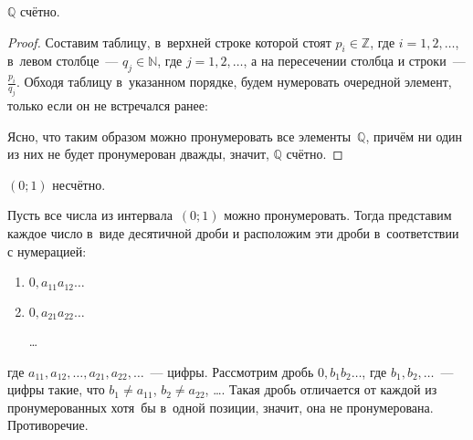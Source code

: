 \begin{statement}
$\mathbb Q$ счётно.
\end{statement}
\begin{proof}
Составим таблицу, в~верхней строке которой стоят $p_i \in \mathbb Z$, где $i = 1, 2, \ldots$, в~левом столбце~--- $q_j \in \mathbb N$, где $j = 1, 2, \ldots$, а на пересечении столбца и строки~--- $\frac{p_i}{q_j}$.
Обходя таблицу в~указанном порядке, будем нумеровать очередной элемент, только если он не встречался ранее:


Ясно, что таким образом можно пронумеровать все элементы~$\mathbb Q$, причём ни один из них не будет пронумерован дважды, значит, $\mathbb Q$ счётно.
\end{proof}

\begin{statement}
$(0; 1)$ несчётно.
\end{statement}
\begin{proofcontra}
Пусть все числа из интервала~$(0; 1)$ можно пронумеровать.
Тогда представим каждое число в~виде десятичной дроби и расположим эти дроби в~соответствии с нумерацией:
\begin{enumerate}
	\item $0{,}a_{11}a_{12} \ldots$
	\item $0{,}a_{21}a_{22} \ldots$
	
	\ldots
\end{enumerate}
где $a_{11}, a_{12}, \ldots, a_{21}, a_{22}, \ldots$~--- цифры.
Рассмотрим дробь $0{,}b_1 b_2 \ldots$, где $b_1, b_2, \ldots$~--- цифры такие, что $b_1 \neq a_{11}$, \linebreak $b_2 \neq a_{22}$, \ldots.
Такая дробь отличается от каждой из пронумерованных хотя~бы в~одной позиции, значит, она не пронумерована.
Противоречие.
\end{proofcontra}

